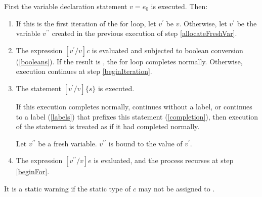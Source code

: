 \documentclass{article}
\newcommand{\code}[1]{{\sf #1}}
\begin{document}
\LMHash{}
First the variable declaration statement \VAR{} $v = e_0$ is executed. Then:
\begin{enumerate}
\item
\label{beginFor}
If this is the first iteration of the for loop, let $v^\prime$ be $v$. Otherwise,  let $v^\prime$ be the variable $v^{\prime\prime}$ created in the previous execution of step \ref{allocateFreshVar}.
\item
The expression $[v^\prime/v]c$ is evaluated and subjected to boolean conversion (\ref{booleans}). If the result is \FALSE{}, the for loop completes normally. Otherwise, execution continues at step
\ref{beginIteration}.
\item
\label{beginIteration}
The statement $[v^\prime/v]\{s\}$ is executed.

If this execution completes normally, continues without a label,
or continues to a label (\ref{labels}) that prefixes this \FOR{} statement (\ref{completion}),
then execution of the statement is treated as if it had completed normally.

\label{allocateFreshVar}
Let $v^{\prime\prime}$ be a fresh variable.  $v^{\prime\prime}$ is bound to the value of $v^\prime$.
\item
The expression $[v^{\prime\prime}/v]e$ is evaluated, and the process recurses at step
  \ref{beginFor}.
\end{enumerate}


\LMHash{}
It is a static warning if the static type of $c$ may not be assigned to .


\end{document}

